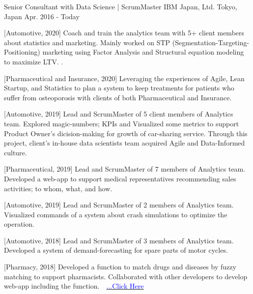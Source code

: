 

\begin{cventries}

  \cventry
    {Senior Consultant with Data Science | ScrumMaster} %
    {IBM Japan, Ltd.} %
    {Tokyo, Japan} %
    {Apr. 2016 - Today} %
    {
      \begin{cvenumerate} %
        \item {[Automotive, 2020] Coach and train the analytics team with 5+ client members about statistics and marketing. Mainly worked on STP (Segmentation-Targeting-Positioning) marketing using Factor Analysis and Structural equation modeling to maximize LTV.
        .}
        \item {[Pharmaceutical and Insurance, 2020] Leveraging the experiences of Agile, Lean Startup, and Statistics to plan a system to keep treatments for patients who suffer from osteoporosis with clients of both Pharmaceutical and Insurance.}
        \item {[Automotive, 2019] Lead and ScrumMaster of 5 client members of Analytics team. Explored magic-numbers; KPIs and Visualized some metrics to support Product Owner's dicision-making for growth of car-sharing service. Through this project, client's in-house data scientists team acquired Agile and Data-Informed culture.}
        \item {[Pharmaceutical, 2019] Lead and ScrumMaster of 7 members of Analytics team. Developed a web-app to support medical representatives recommending sales activities; to whom, what, and how.}
        \item {[Automotive, 2019] Lead and ScrumMaster of 2 members of Analytics team. Visualized commands of a system about crash simulations to optimize the operation.}
        \item {[Automotive, 2018] Lead and ScrumMaster of 3 members of Analytics team. Developed a system of demand-forecasting for spare parts of motor cycles.}
        \item {[Pharmacy, 2018] Developed a function to match drugs and diseases by fuzzy matching to support pharmacists. Collaborated with other developers to develop web-app including the function.　\href{https://www.ibm.com/think/jp-ja/business/sakura-ai/}{\textcolor{blue}{...Click Here}}}

\end{cvenumerate}}
\end{cventries}
